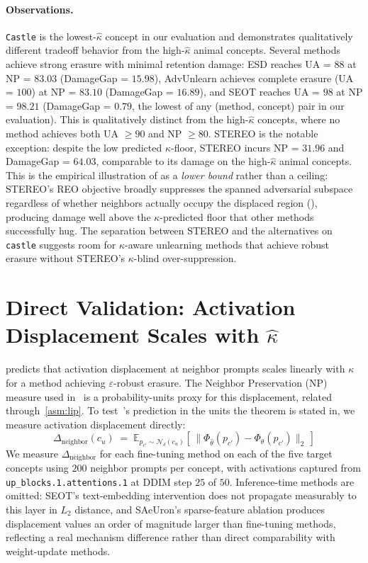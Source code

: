 \paragraph{Observations.}
\texttt{Castle} is the lowest-$\hat\kappa$ concept in our evaluation and demonstrates qualitatively different tradeoff behavior from the high-$\hat\kappa$ animal concepts. Several methods achieve strong erasure with minimal retention damage: ESD reaches UA = $88$ at NP = $83.03$ (DamageGap = $15.98$), AdvUnlearn achieves complete erasure (UA = $100$) at NP = $83.10$ (DamageGap = $16.89$), and SEOT reaches UA = $98$ at NP = $98.21$ (DamageGap = $0.79$, the lowest of any (method, concept) pair in our evaluation). This is qualitatively distinct from the high-$\hat\kappa$ concepts, where no method achieves both UA $\geq 90$ and NP $\geq 80$. STEREO is the notable exception: despite the low predicted $\kappa$-floor, STEREO incurs NP = $31.96$ and DamageGap = $64.03$, comparable to its damage on the high-$\hat\kappa$ animal concepts. This is the empirical illustration of  as a \emph{lower bound} rather than a ceiling: STEREO's REO objective broadly suppresses the spanned adversarial subspace regardless of whether neighbors actually occupy the displaced region (), producing damage well above the $\kappa$-predicted floor that other methods successfully hug. The separation between STEREO and the alternatives on \texttt{castle} suggests room for $\kappa$-aware unlearning methods that achieve robust erasure without STEREO's $\kappa$-blind over-suppression.
\section{Direct Validation: Activation Displacement Scales with $\hat\kappa$}
\label{app:displacement_kappa}
 predicts that activation displacement at neighbor prompts scales linearly with $\kappa$ for a method achieving $\varepsilon$-robust erasure. The Neighbor Preservation (NP) measure used in~ is a probability-units proxy for this displacement, related through~\cref{asm:lip}. To test~'s prediction in the units the theorem is stated in, we measure activation displacement directly:
\[
\Delta_{\text{neighbor}}(c_u) \;=\; \mathbb{E}_{p_{c'} \sim \mathcal{N}_\delta(c_u)}\!\left[\, \big\| \Phi_{\hat\theta}(p_{c'}) - \Phi_\theta(p_{c'}) \big\|_2 \,\right]
\]
We measure $\Delta_{\text{neighbor}}$ for each fine-tuning method on each of the five target concepts using $200$ neighbor prompts per concept, with activations captured from \texttt{up\_blocks.1.attentions.1} at DDIM step $25$ of $50$. Inference-time methods are omitted: SEOT's text-embedding intervention does not propagate measurably to this layer in $L_2$ distance, and SAeUron's sparse-feature ablation produces displacement values an order of magnitude larger than fine-tuning methods, reflecting a real mechanism difference rather than direct comparability with weight-update methods.

